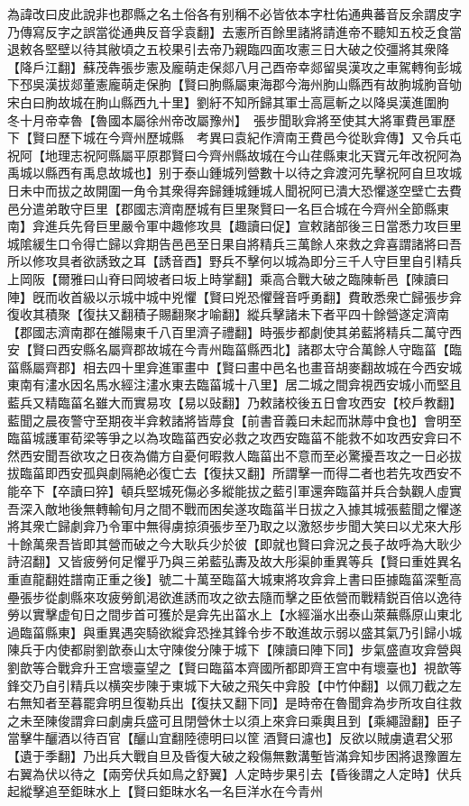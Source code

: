 為諱改曰皮此說非也郡縣之名土俗各有别稱不必皆依本字杜佑通典蕃音反余謂皮字乃傳寫反字之誤當從通典反音孚袁翻】去憲所百餘里諸將請進帝不聽知五校乏食當退敕各堅壁以待其敝頃之五校果引去帝乃親臨四面攻憲三日大破之佼彊將其衆降【降戶江翻】蘇茂犇張步憲及龐萌走保郯八月己酉帝幸郯留吳漢攻之車駕轉徇彭城下邳吳漢拔郯董憲龐萌走保朐【賢曰朐縣屬東海郡今海州朐山縣西有故朐城朐音劬宋白曰朐故城在朐山縣西九十里】劉紆不知所歸其軍士高扈斬之以降吳漢進圍朐　冬十月帝幸魯【魯國本屬徐州帝改屬豫州】　張步聞耿弇將至使其大將軍費邑軍歷下【賢曰歷下城在今齊州歷城縣　考異曰袁紀作濟南王費邑今從耿弇傳】又令兵屯祝阿【地理志祝阿縣屬平原郡賢曰今齊州縣故城在今山荏縣東北天寶元年改祝阿為禹城以縣西有禹息故城也】别于泰山鍾城列營數十以待之弇渡河先擊祝阿自旦攻城日未中而拔之故開圍一角令其衆得奔歸鍾城鍾城人聞祝阿已潰大恐懼遂空壁亡去費邑分遣弟敢守巨里【郡國志濟南歷城有巨里聚賢曰一名巨合城在今齊州全節縣東南】弇進兵先脅巨里嚴令軍中趣修攻具【趣讀曰促】宣敕諸部後三日當悉力攻巨里城隂緩生口令得亡歸以弇期告邑邑至日果自將精兵三萬餘人來救之弇喜謂諸將曰吾所以修攻具者欲誘致之耳【誘音酉】野兵不擊何以城為即分三千人守巨里自引精兵上岡阪【爾雅曰山脊曰岡坡者曰坂上時掌翻】乘高合戰大破之臨陳斬邑【陳讀曰陣】旣而收首級以示城中城中兇懼【賢曰兇恐懼聲音呼勇翻】費敢悉衆亡歸張步弇復收其積聚【復扶又翻積子賜翻聚才喻翻】縱兵擊諸未下者平四十餘營遂定濟南【郡國志濟南郡在雒陽東千八百里濟子禮翻】時張步都劇使其弟藍將精兵二萬守西安【賢曰西安縣名屬齊郡故城在今青州臨菑縣西北】諸郡太守合萬餘人守臨菑【臨菑縣屬齊郡】相去四十里弇進軍畫中【賢曰畫中邑名也畫音胡麥翻故城在今西安城東南有澅水因名馬水經注澅水東去臨菑城十八里】居二城之間弇視西安城小而堅且藍兵又精臨菑名雖大而實易攻【易以䜴翻】乃敕諸校後五日會攻西安【校戶教翻】藍聞之晨夜警守至期夜半弇敕諸將皆蓐食【前書音義曰未起而牀蓐中食也】會明至臨菑城護軍荀梁等爭之以為攻臨菑西安必救之攻西安臨菑不能救不如攻西安弇曰不然西安聞吾欲攻之日夜為備方自憂何暇救人臨菑出不意而至必驚擾吾攻之一日必拔拔臨菑即西安孤與劇隔絶必復亡去【復扶又翻】所謂擊一而得二者也若先攻西安不能卒下【卒讀曰猝】頓兵堅城死傷必多縱能拔之藍引軍還奔臨菑并兵合埶觀人虛實吾深入敵地後無轉輸旬月之間不戰而困矣遂攻臨菑半日拔之入據其城張藍聞之懼遂將其衆亡歸劇弇乃令軍中無得虜掠須張步至乃取之以激怒步步聞大笑曰以尤來大彤十餘萬衆吾皆即其營而破之今大耿兵少於彼【即就也賢曰弇況之長子故呼為大耿少詩沼翻】又皆疲勞何足懼乎乃與三弟藍弘夀及故大彤渠帥重異等兵【賢曰重姓異名重直龍翻姓譜南正重之後】號二十萬至臨菑大城東將攻弇弇上書曰臣據臨菑深塹高壘張步從劇縣來攻疲勞飢渇欲進誘而攻之欲去隨而擊之臣依營而戰精鋭百倍以逸待勞以實擊虚旬日之間步首可獲於是弇先出菑水上【水經淄水出泰山萊蕪縣原山東北過臨菑縣東】與重異遇突騎欲縱弇恐挫其鋒令步不敢進故示弱以盛其氣乃引歸小城陳兵于内使都尉劉歆泰山太守陳俊分陳于城下【陳讀曰陣下同】步氣盛直攻弇營與劉歆等合戰弇升王宫壞臺望之【賢曰臨菑本齊國所都即齊王宫中有壞臺也】視歆等鋒交乃自引精兵以横突步陳于東城下大破之飛矢中弇股【中竹仲翻】以佩刀截之左右無知者至暮罷弇明旦復勒兵出【復扶又翻下同】是時帝在魯聞弇為步所攻自往救之未至陳俊謂弇曰劇虜兵盛可且閉營休士以須上來弇曰乘輿且到【乘繩證翻】臣子當擊牛釃酒以待百官【釃山宜翻陸德明曰以筐酒賢曰濾也】反欲以賊虜遺君父邪【遺于季翻】乃出兵大戰自旦及昏復大破之殺傷無數溝塹皆滿弇知步困將退豫置左右翼為伏以待之【兩旁伏兵如鳥之舒翼】人定時步果引去【昏後謂之人定時】伏兵起縱擊追至鉅昩水上【賢曰鉅昩水名一名巨洋水在今青州